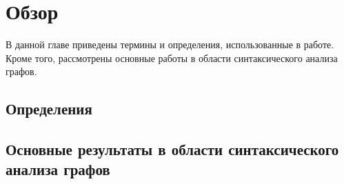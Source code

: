 \clearpage
\setmonofont[Mapping=tex-text]{CMU Typewriter Text}
\section{Обзор}
В данной главе приведены термины и определения, использованные в работе. Кроме того, рассмотрены основные работы в области синтаксического анализа графов.

\subsection{Определения}

\subsection{Основные результаты в области синтаксического анализа графов}
